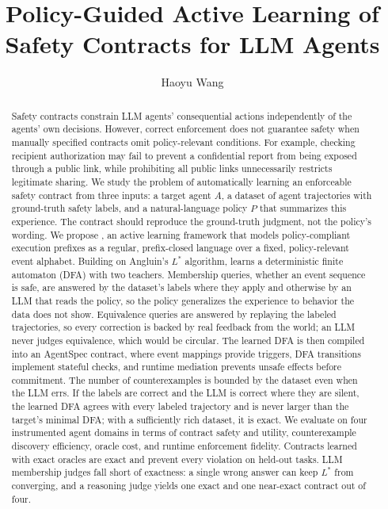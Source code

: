 \documentclass[sigconf,review,anonymous]{acmart}
\begin{document}
\title{Policy-Guided Active Learning of Safety Contracts for LLM Agents}

\author{Haoyu Wang}
\begin{abstract}
Safety contracts constrain LLM agents' consequential actions independently of the agents' own decisions. However, correct enforcement does not guarantee safety when manually specified contracts omit policy-relevant conditions. For example, checking recipient authorization may fail to prevent a confidential report from being exposed through a public link, while prohibiting all public links unnecessarily restricts legitimate sharing. We study the problem of automatically learning an enforceable safety contract from three inputs: a target agent $A$, a dataset of agent trajectories with ground-truth safety labels, and a natural-language policy $P$ that summarizes this experience. The contract should reproduce the ground-truth judgment, not the policy's wording. We propose \system{}, an active learning framework that models policy-compliant execution prefixes as a regular, prefix-closed language over a fixed, policy-relevant event alphabet. Building on Angluin's $L^*$ algorithm, \system{} learns a deterministic finite automaton (DFA) with two teachers. Membership queries, whether an event sequence is safe, are answered by the dataset's labels where they apply and otherwise by an LLM that reads the policy, so the policy generalizes the experience to behavior the data does not show. Equivalence queries are answered by replaying the labeled trajectories, so every correction is backed by real feedback from the world; an LLM never judges equivalence, which would be circular. The learned DFA is then compiled into an AgentSpec contract, where event mappings provide triggers, DFA transitions implement stateful checks, and runtime mediation prevents unsafe effects before commitment. The number of counterexamples is bounded by the dataset even when the LLM errs. If the labels are correct and the LLM is correct where they are silent, the learned DFA agrees with every labeled trajectory and is never larger than the target's minimal DFA; with a sufficiently rich dataset, it is exact. We evaluate \system{} on four instrumented agent domains in terms of contract safety and utility, counterexample discovery efficiency, oracle cost, and runtime enforcement fidelity. Contracts learned with exact oracles are exact and prevent every violation on held-out tasks. LLM membership judges fall short of exactness: a single wrong answer can keep $L^*$ from converging, and a reasoning judge yields one exact and one near-exact contract out of four.
\end{abstract}
\maketitle
\end{document}
